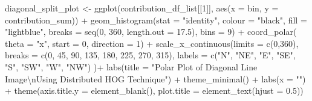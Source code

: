 \documentclass[
  letterpaper,
]{report}
\newenvironment{Shaded}{\begin{snugshade}}{\end{snugshade}}
\newcommand{\AttributeTok}[1]{\textcolor[rgb]{0.40,0.45,0.13}{#1}}
\newcommand{\DecValTok}[1]{\textcolor[rgb]{0.68,0.00,0.00}{#1}}
\newcommand{\FloatTok}[1]{\textcolor[rgb]{0.68,0.00,0.00}{#1}}
\newcommand{\FunctionTok}[1]{\textcolor[rgb]{0.28,0.35,0.67}{#1}}
\newcommand{\NormalTok}[1]{\textcolor[rgb]{0.00,0.23,0.31}{#1}}
\newcommand{\OtherTok}[1]{\textcolor[rgb]{0.00,0.23,0.31}{#1}}
\newcommand{\SpecialCharTok}[1]{\textcolor[rgb]{0.37,0.37,0.37}{#1}}
\newcommand{\StringTok}[1]{\textcolor[rgb]{0.13,0.47,0.30}{#1}}
\begin{document}
\begin{Shaded}
\begin{Highlighting}[]
\NormalTok{diagonal\_split\_plot }\OtherTok{\textless{}{-}}
  \FunctionTok{ggplot}\NormalTok{(contribution\_df\_list[[}\DecValTok{1}\NormalTok{]], }
         \FunctionTok{aes}\NormalTok{(}\AttributeTok{x =}\NormalTok{ bin, }\AttributeTok{y =}\NormalTok{ contribution\_sum)) }\SpecialCharTok{+}
  \FunctionTok{geom\_histogram}\NormalTok{(}\AttributeTok{stat =} \StringTok{"identity"}\NormalTok{,}
                 \AttributeTok{colour =} \StringTok{"black"}\NormalTok{, }
                 \AttributeTok{fill =} \StringTok{"lightblue"}\NormalTok{, }
                 \AttributeTok{breaks =} \FunctionTok{seq}\NormalTok{(}\DecValTok{0}\NormalTok{, }\DecValTok{360}\NormalTok{, }\AttributeTok{length.out =} \FloatTok{17.5}\NormalTok{),}
                 \AttributeTok{bins =} \DecValTok{9}\NormalTok{) }\SpecialCharTok{+}
  \FunctionTok{coord\_polar}\NormalTok{(}
    \AttributeTok{theta =} \StringTok{"x"}\NormalTok{, }
    \AttributeTok{start =} \DecValTok{0}\NormalTok{, }
    \AttributeTok{direction =} \DecValTok{1}\NormalTok{) }\SpecialCharTok{+}
  \FunctionTok{scale\_x\_continuous}\NormalTok{(}\AttributeTok{limits =} \FunctionTok{c}\NormalTok{(}\DecValTok{0}\NormalTok{,}\DecValTok{360}\NormalTok{),}
    \AttributeTok{breaks =} \FunctionTok{c}\NormalTok{(}\DecValTok{0}\NormalTok{, }\DecValTok{45}\NormalTok{, }\DecValTok{90}\NormalTok{, }\DecValTok{135}\NormalTok{, }\DecValTok{180}\NormalTok{, }\DecValTok{225}\NormalTok{, }\DecValTok{270}\NormalTok{, }\DecValTok{315}\NormalTok{), }
    \AttributeTok{labels =} \FunctionTok{c}\NormalTok{(}\StringTok{"N"}\NormalTok{, }\StringTok{"NE"}\NormalTok{, }\StringTok{"E"}\NormalTok{, }\StringTok{"SE"}\NormalTok{, }\StringTok{"S"}\NormalTok{, }\StringTok{"SW"}\NormalTok{, }\StringTok{"W"}\NormalTok{, }\StringTok{"NW"}\NormalTok{)}
\NormalTok{  )}\SpecialCharTok{+}
  \FunctionTok{labs}\NormalTok{(}\AttributeTok{title =} \StringTok{"Polar Plot of Diagonal Line Image}\SpecialCharTok{\textbackslash{}n}\StringTok{Using Distributed HOG Technique"}\NormalTok{) }\SpecialCharTok{+}
  \FunctionTok{theme\_minimal}\NormalTok{() }\SpecialCharTok{+}
  \FunctionTok{labs}\NormalTok{(}\AttributeTok{x =} \StringTok{""}\NormalTok{) }\SpecialCharTok{+}
  \FunctionTok{theme}\NormalTok{(}\AttributeTok{axis.title.y =} \FunctionTok{element\_blank}\NormalTok{(),}
        \AttributeTok{plot.title =} \FunctionTok{element\_text}\NormalTok{(}\AttributeTok{hjust =} \FloatTok{0.5}\NormalTok{))}
\end{Highlighting}
\end{Shaded}
\end{document}

